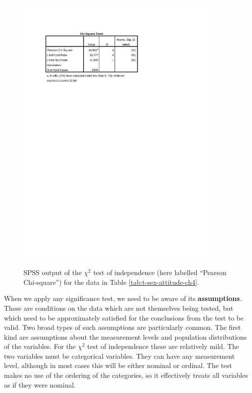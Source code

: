 \documentclass[11pt,a4paper,openany]{book}
\begin{document}
\begin{figure}[htbp]
\centering
\includegraphics[width=10.00000cm]{chi2test_ess.pdf}
\caption{\label{fig:f-spsschi2} SPSS output of the \(\chi^{2}\) test of
independence (here labelled ``Pearson Chi-square'') for the data in
Table \ref{tab:t-sex-attitude-ch4}.}
\end{figure}

When we apply any significance test, we need to be aware of its
\textbf{assumptions}. These are conditions on the data which are not
themselves being tested, but which need to be approximately satisfied
for the conclusions from the test to be valid. Two broad types of such
assumptions are particularly common. The first kind are assumptions
about the measurement levels and population distributions of the
variables. For the \(\chi^{2}\) test of independence these are
relatively mild. The two variables must be categorical variables. They
can have any measurement level, although in most cases this will be
either nominal or ordinal. The test makes no use of the ordering of the
categories, so it effectively treats all variables as if they were
nominal.
\end{document}
